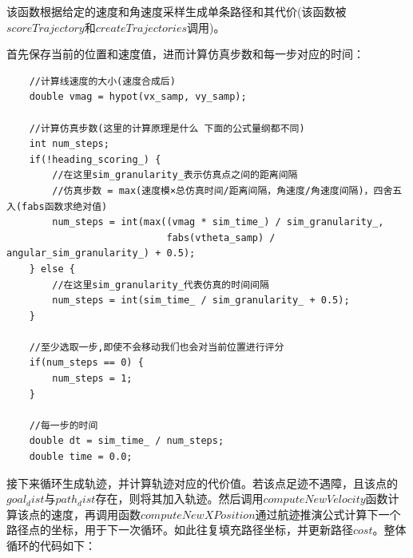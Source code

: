 \documentclass[9pt, oneside]{book}
\begin{document}
该函数根据给定的速度和角速度采样生成单条路径和其代价(该函数被$scoreTrajectory$和$createTrajectories$调用)。

首先保存当前的位置和速度值，进而计算仿真步数和每一步对应的时间：

\footnotesize
\begin{verbatim}
    //计算线速度的大小(速度合成后)
    double vmag = hypot(vx_samp, vy_samp);

    //计算仿真步数(这里的计算原理是什么 下面的公式量纲都不同)
    int num_steps;
    if(!heading_scoring_) {
        //在这里sim_granularity_表示仿真点之间的距离间隔
        //仿真步数 = max(速度模×总仿真时间/距离间隔，角速度/角速度间隔)，四舍五入(fabs函数求绝对值)
        num_steps = int(max((vmag * sim_time_) / sim_granularity_, 
                            fabs(vtheta_samp) / angular_sim_granularity_) + 0.5);
    } else {
        //在这里sim_granularity_代表仿真的时间间隔
        num_steps = int(sim_time_ / sim_granularity_ + 0.5);
    }

    //至少选取一步,即使不会移动我们也会对当前位置进行评分
    if(num_steps == 0) {
        num_steps = 1;
    }

    //每一步的时间
    double dt = sim_time_ / num_steps;
    double time = 0.0;
\end{verbatim}
\normalsize

接下来循环生成轨迹，并计算轨迹对应的代价值。若该点足迹不遇障，且该点的$goal_dist$与$path_dist$存在，则将其加入轨迹。然后调用$computeNewVelocity$函数计算该点的速度，再调用函数$computeNewXPosition$通过航迹推演公式计算下一个路径点的坐标，用于下一次循环。如此往复填充路径坐标，并更新路径$cost$。整体循环的代码如下：
\end{document}
